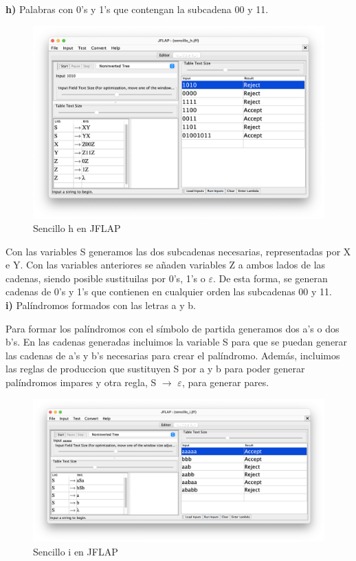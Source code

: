 \textbf{h)}  Palabras con 0's y 1's que contengan la subcadena 00 y 11.

\begin{figure}[H] 
	\centering
	\includegraphics[scale=0.35]{../practica_1/images/sencillo_h.png} 
	\caption{Sencillo h en JFLAP} 
    \label{fig:sencillo_h}
\end{figure}

Con las variables S generamos las dos subcadenas necesarias, representadas por X e Y. Con las variables anteriores se añaden variables Z a ambos lados de las
cadenas, siendo posible sustituilas por 0's, 1's o $\varepsilon$. De esta forma, se generan cadenas de 0's y 1's que contienen en cualquier orden las subcadenas 00 y 11. \\

\textbf{i)}  Palíndromos formados con las letras a y b.

Para formar los palíndromos con el símbolo de partida generamos dos a's o dos b's. En las cadenas generadas incluimos la variable S para que se puedan generar las cadenas de 
a's y b's necesarias para crear el palíndromo. Además, incluimos las reglas de produccion que sustituyen S por a y b para poder generar palíndromos impares y otra regla,
S $\rightarrow$ $\varepsilon$, para generar pares.

\begin{figure}[H] 
	\centering
	\includegraphics[scale=0.375]{../practica_1/images/sencillo_i.png} 
	\caption{Sencillo i en JFLAP} 
    \label{fig:sencillo_i}
\end{figure}

